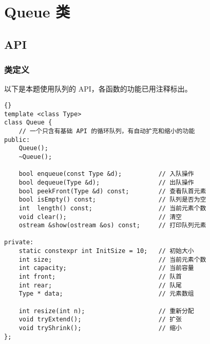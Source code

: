 
\chapter{Queue 类}

\section{API}

\subsection{类定义}
以下是本题使用队列的 API，各函数的功能已用注释标出。
\begin{lstlisting}[morendkeywords={Queue}, firstnumber=9, caption=Queue 类定义]{}
template <class Type>
class Queue {
    // 一个只含有基础 API 的循环队列，有自动扩充和缩小的功能
public:
    Queue();
    ~Queue();

    bool enqueue(const Type &d);          // 入队操作
    bool dequeue(Type &d);                // 出队操作
    bool peekFront(Type &d) const;        // 查看队首元素
    bool isEmpty() const;                 // 队列是否为空
    int  length() const;                  // 当前元素个数
    void clear();                         // 清空
    ostream &show(ostream &os) const;     // 打印队列元素

private:
    static constexpr int InitSize = 10;   // 初始大小
    int size;                             // 当前元素个数
    int capacity;                         // 当前容量
    int front;                            // 队首
    int rear;                             // 队尾
    Type * data;                          // 元素数组

    int resize(int n);                    // 重新分配
    void tryExtend();                     // 扩张
    void tryShrink();                     // 缩小
};
\end{lstlisting}
\vspace*{1cm}

